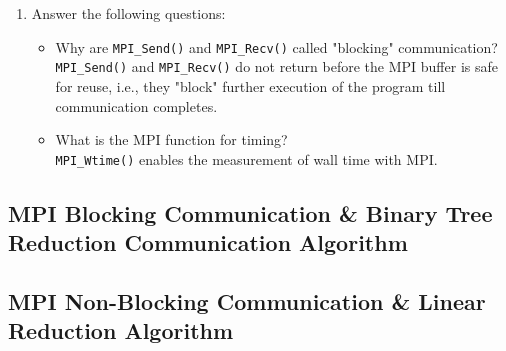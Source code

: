 \documentclass[12pt]{article}
\begin{document}
\begin{enumerate}
    \item Answer the following questions:
    \begin{itemize}
        \item Why are \texttt{MPI\_Send()} and \texttt{MPI\_Recv()} called "blocking" communication?\\
         \texttt{MPI\_Send()} and \texttt{MPI\_Recv()} do not return before the MPI buffer is safe for reuse, i.e., they "block" further execution of the program till communication completes.
        \item What is the MPI function for timing?\\
        \texttt{MPI\_Wtime()} enables the measurement of wall time with MPI.
    \end{itemize}
\end{enumerate}

\subsection{MPI Blocking Communication \& Binary Tree Reduction Communication Algorithm}

\subsection{MPI Non-Blocking Communication \& Linear Reduction Algorithm}
\end{document}
